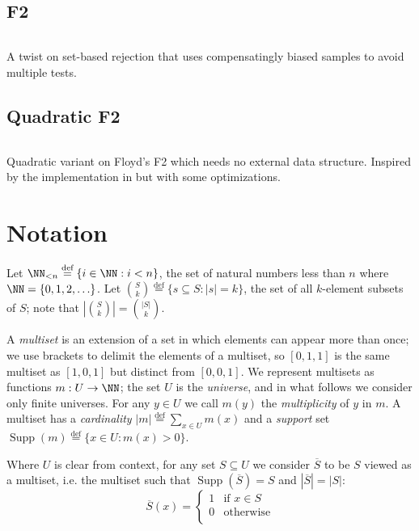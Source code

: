\documentclass[letterpaper,luatex,11pt]{article}
\newcommand*{\defeq}{\stackrel{\text{def}}{=}}
\DeclareMathOperator{\Supp}{Supp}
\begin{document}
\subsection{F2}
\inputminted{Python}{code/floydf2.py}
A twist on set-based rejection that uses compensatingly biased
samples to avoid multiple tests.
\cite{floydf2}

\subsection{Quadratic F2}
\inputminted{Python}{code/quadraticf2.py}
Quadratic variant on Floyd's F2 which needs no external data structure.
Inspired by the implementation in \cite{rust-random} but with some optimizations.

\section{Notation}

Let \(\NN_{<n} \defeq \{i \in \NN: i < n\}\), the set of natural numbers less than \(n\)
where \(\NN = \{0, 1, 2, \ldots\}\). 
Let \(\binom{S}{k} \defeq \{s \subseteq S: |s| = k\}\), the set of all \(k\)-element subsets
of \(S\); note that \(\left|\binom{S}{k}\right| = \binom{|S|}{k}\).

A \emph{multiset} is an extension of a set in which elements can appear more than once;
we use brackets to delimit the elements of a multiset, so
$[0, 1, 1]$ is the same multiset as $[1, 0, 1]$ but distinct from $[0, 0, 1]$.
We represent multisets as functions $m: U \rightarrow \NN$; the set $U$ is the \emph{universe},
and in what follows we consider only finite universes. For any $y \in U$ we call
$m(y)$ the \emph{multiplicity} of $y$ in $m$.
A multiset has a \emph{cardinality} $|m| \defeq \sum_{x \in U} m(x)$
and a \emph{support} set $\Supp(m) \defeq \{x \in U: m(x) > 0\}$.

Where $U$ is clear from context, for any set $S \subseteq U$ we consider
$\overline{S}$ to be $S$ viewed as a multiset, i.e. the multiset
such that $\Supp(\overline{S}) = S$ and $|\overline{S}| = |S|$:
\begin{displaymath}
    \overline{S}(x) =
    \begin{cases}
        1 & \text{if $x \in S$} \\
        0 & \text{otherwise} \\
    \end{cases}
\end{displaymath}
\end{document}
